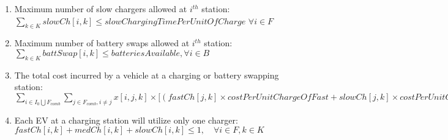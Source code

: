 \documentclass[conference]{IEEEtran}
\begin{document}
\begin{enumerate}
    \item Maximum number of slow chargers  allowed at $i^{th}$ station: \\ 
     $\sum_{k \in K} slowCh[i, k] \leq slowChargingTimePerUnitOfCharge$ \quad $ \forall i \in F$ \\
    
    \item Maximum number of battery swaps allowed at $i^{th}$ station: \\ 
    $\sum_{k \in K} battSwap[i, k] \leq batteriesAvailable,  \forall i \in B$ \\
    
    \item The total cost incurred by a vehicle at a charging or battery swapping station: \\
    $\sum_{i \in I_{0} \bigcup F_{comb}} \sum_{j \in F_{comb}, i \neq j} x[i, j, k] \times [(fastCh[j,k] \times costPerUnitChargeOfFast + slowCh[j,k] \times costPerUnitChargeOfSlow + medCh[j,k]\times costPerUnitChargeOfMedium)  \times (mxBatteryLevels[k]-y[j,k]) + battSwap[j,k]\times batterySwappingCost\leq Cost[k],  \quad \forall k \in K$ \\
       
    \item Each EV at a charging station will utilize only one charger:\\
    $fastCh[i,k] + medCh[i,k] + slowCh[i,k] \leq 1,  \quad \forall i \in F,  k \in K$

  
\end{enumerate}
    
 
\end{document}
